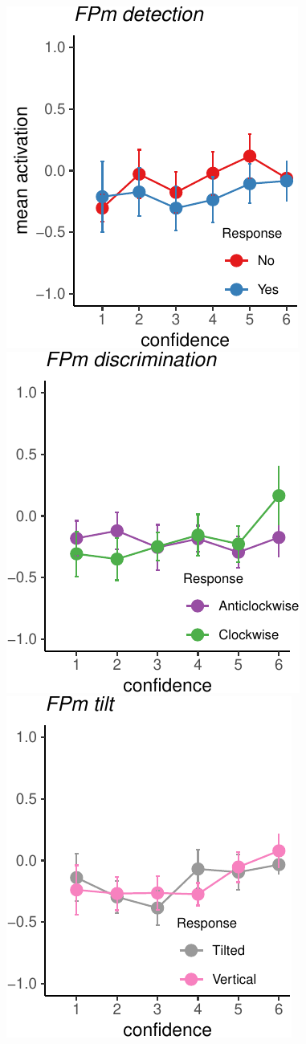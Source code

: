 \documentclass[
]{article}
\begin{document}
\includegraphics{Chudi-Thesis-2020_files/figure-latex/unnamed-chunk-12-1.pdf}
\includegraphics{Chudi-Thesis-2020_files/figure-latex/unnamed-chunk-12-2.pdf}
\includegraphics{Chudi-Thesis-2020_files/figure-latex/unnamed-chunk-12-3.pdf}
\end{document}
